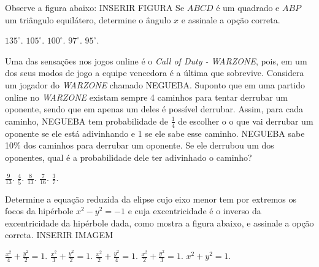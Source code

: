 \begin{question}%
Observe a figura abaixo:
INSERIR FIGURA
Se \(ABCD\) é um quadrado e \(ABP\) um triângulo equilátero, determine o ângulo \(x\) e assinale a opção correta.
    \begin{tasks}
        \task \(135^\circ\).
        \task \(105^\circ\).
        \task \(100^\circ\).
        \task \(97^\circ\).
        \task \(95^\circ\).
    \end{tasks}
\end{question}

\begin{question}%
Uma das sensações nos jogos online é o \textit{Call of Duty - WARZONE}, pois, em um dos seus modos de jogo a equipe vencedora é a última que sobrevive. Considera um jogador do \textit{WARZONE} chamado NEGUEBA. Suponto que em uma partido online no \textit{WARZONE} existam sempre 4 caminhos para tentar derrubar um oponente, sendo que em apenas um deles é possível derrubar. Assim, para cada caminho, NEGUEBA tem probabilidade de \(\frac{1}{4}\) de escolher o o que vai derrubar um oponente se ele está adivinhando e 1 se ele sabe esse caminho. NEGUEBA sabe 10\% dos caminhos para derrubar um oponente. Se ele derrubou um dos oponentes, qual é a probabilidade dele ter adivinhado o caminho?
    \begin{tasks}
        \task \(\frac{9}{13}\).
        \task \(\frac{4}{5}\).
        \task \(\frac{8}{13}\).
        \task \(\frac{7}{16}\).
        \task \(\frac{3}{7}\).
    \end{tasks}
\end{question}

\begin{question}%
Determine a equação reduzida da elipse cujo eixo menor tem por extremos os focos da hipérbole \(x^2 - y^2 = -1\) e cuja excentricidade é o inverso da excentricidade da hipérbole dada, como mostra a figura abaixo, e assinale a opção correta.
INSERIR IMAGEM
    \begin{tasks}
        \task \(\frac{x^2}{4} + \frac{y^2}{2} = 1 \).
        \task \(\frac{x^2}{3} + \frac{y^2}{2} = 1 \).
        \task \(\frac{x^2}{2} + \frac{y^2}{4} = 1 \).
        \task \(\frac{x^2}{2} + \frac{y^2}{3} = 1 \).
        \task \(x^2 + y^2 = 1\).
    \end{tasks}
\end{question}

